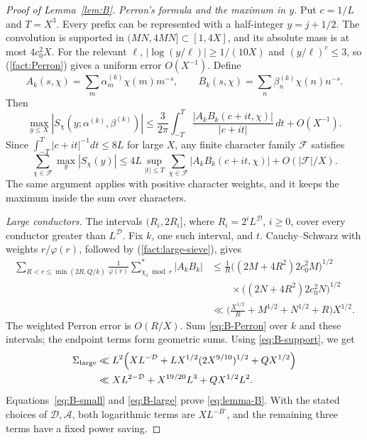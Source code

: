 \documentclass{amsart}
\newcounter{fact}
\numberwithin{equation}{section}
\numberwithin{table}{section}
\begin{document}
\begin{proof}[Proof of Lemma~\ref{lem:B}]
\noindent\textit{Perron's formula and the maximum in $y$.}
Put $c=1/L$ and $T=X^3$. Every prefix can be represented with a
half-integer $y=j+1/2$. The convolution is supported in $(MN,4MN]\subset[1,4X]$,
and its absolute mass is at most $4c_0^2X$.
For the relevant $\ell$, $|\log(y/\ell)|\ge1/(10X)$ and $(y/\ell)^c\le3$,
so (\ref{fact:Perron}) gives a uniform error $O(X^{-1})$. Define
\[
A_k(s,\chi)=\sum_m\alpha_m^{(k)}\chi(m)m^{-s},\qquad
B_k(s,\chi)=\sum_n\beta_n^{(k)}\chi(n)n^{-s}.
\]
Then
\[
\max_{y\le X}|S_\chi(y;\alpha^{(k)},\beta^{(k)})|
\le\frac{3}{2\pi}\int_{-T}^T
\frac{|A_kB_k(c+it,\chi)|}{|c+it|}\,dt+O(X^{-1}).
\]
Since $\int_{-T}^T|c+it|^{-1}dt\le8L$ for large $X$,
any finite character family $\mathcal F$ satisfies
\begin{equation}\label{eq:B-Perron}
\sum_{\chi\in\mathcal F}\max_y|S_\chi(y)|
\le4L\sup_{|t|\le T}\sum_{\chi\in\mathcal F}|A_kB_k(c+it,\chi)|
+O(|\mathcal F|/X).
\end{equation}
The same argument applies with positive character weights, and it keeps
the maximum inside the sum over characters.

\noindent\textit{Large conductors.}
The intervals $(R_i,2R_i]$, where $R_i=2^iL^{\mathcal D}$, $i\ge0$,
cover every conductor greater than $L^{\mathcal D}$.
Fix $k$, one such interval, and $t$.
Cauchy--Schwarz with weights $r/\varphi(r)$, followed by
(\ref{fact:large-sieve}), gives
\begin{align*}
\sum_{R<r\le\min(2R,Q/k)}\frac1{\varphi(r)}
\sum_{\chi_1\bmod r}^{*}|A_kB_k|
&\le\frac1R\big((2M+4R^2)2c_0^2M\big)^{1/2}\\
&\qquad\times\big((2N+4R^2)2c_0^2N\big)^{1/2}\\
&\ll\Big(\frac{X^{1/2}}R+M^{1/2}+N^{1/2}+R\Big)X^{1/2}.
\end{align*}
The weighted Perron error is $O(R/X)$.
Sum \eqref{eq:B-Perron} over $k$ and these intervals; the endpoint terms
form geometric sums. Using \eqref{eq:B-support}, we get
\begin{align}
\Sigma_{\mathrm{large}}
&\ll L^2\Big(XL^{-\mathcal D}
+LX^{1/2}(2X^{9/10})^{1/2}+QX^{1/2}\Big)\notag\\
&\ll XL^{2-\mathcal D}+X^{19/20}L^3+QX^{1/2}L^2.
\label{eq:B-large}
\end{align}
Equations~\eqref{eq:B-small} and \eqref{eq:B-large} prove \eqref{eq:lemma-B}.
With the stated choices of $\mathcal D,\mathcal A$, both logarithmic terms
are $XL^{-B'}$, and the remaining three terms have a fixed power saving.
\end{proof}
\end{document}
